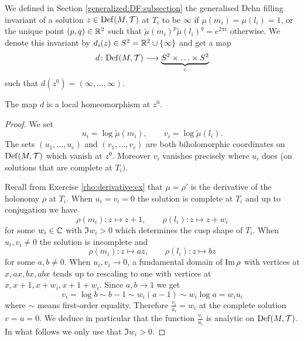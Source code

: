 We defined in Section \ref{generalized:DF:subsection} the generalised Dehn filling invariant of a solution $z\in{\rm Def}(M,\mathcal{T})$ at $T_i$ to be $\infty$ if $\mu(m_i) = \mu(l_i)=1$, or the unique point $(p,q)\in \mathbb{R}^2$ such that $\tilde\mu(m_i)^p \tilde\mu(l_i)^q = e^{2\pi i}$ otherwise. We denote this invariant by $d_i(z)\in S^2 = \mathbb{R}^2 \cup \{\infty\}$ and get a map 
$$d\colon {\rm Def}(M,\mathcal{T}) \longrightarrow \underbrace{S^2 \times \ldots \times S^2}_c$$
such that $d(z^0) = (\infty,\ldots,\infty)$.

\begin{prop} \label{d:local:homeo:prop}
The map $d$ is a local homeomorphism at $z^0$.
\end{prop}
\begin{proof}
We set
$$u_i = \log \tilde\mu(m_i), \qquad v_i = \log \tilde \mu(l_i).$$
The sets $(u_1,\ldots,u_c)$ and $(v_1,\ldots, v_c)$ are both biholomorphic coordinates on ${\rm Def}(M,\mathcal{T})$ which vanish at $z^0$. Moreover $v_i$ vanishes precisely where $u_i$ does (on solutions that are complete at $T_i)$. 

Recall from Exercise \ref{rho:derivative:ex} that $\mu = \rho'$ is the derivative of the holonomy $\rho$ at $T_i$. When $u_i = v_i = 0$ the solution is complete at $T_i$ and up to conjugation we have
$$\rho(m_i)\colon z \mapsto z +1, \qquad \rho(l_i)\colon z \mapsto z + w_i$$
for some $w_i\in \mathbb{C}$ with $\Im w_i>0$ which determines the cusp shape of $T_i$. When $u_i, v_i \neq 0$ the solution is incomplete and
$$\rho(m_i) \colon z \mapsto az, \qquad \rho(l_i) \colon z \mapsto bz$$
for some $a,b\neq 0$.
When $u_i, v_i \to 0$, a fundamental domain of ${\rm Im\,}\rho$ with vertices at $x,ax, bx, abx$ tends up to rescaling to one with vertices at $x, x+1, x+w_i, x+1+w_i$. Since $a,b \to 1$ we get
$$v_i = \log b \sim b-1 \sim w_i(a-1) \sim w_i \log a = w_iu_i$$
where $\sim$ means first-order equality. Therefore $\frac{v_i}{u_i} = w_i$ at the complete solution $v=u=0$. We deduce in particular that the function $\frac{v_i}{u_i}$ is analytic on ${\rm Def}(M,\mathcal{T})$.
In what follows we only use that $\Im w_i > 0$.


\end{proof}
